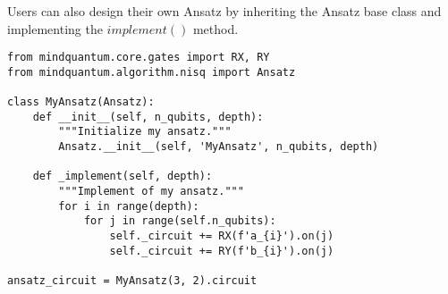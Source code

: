 Users can also design their own Ansatz by inheriting the Ansatz base class and implementing the $implement()$ method.

\begin{lstlisting}
from mindquantum.core.gates import RX, RY
from mindquantum.algorithm.nisq import Ansatz

class MyAnsatz(Ansatz):
    def __init__(self, n_qubits, depth):
        """Initialize my ansatz."""
        Ansatz.__init__(self, 'MyAnsatz', n_qubits, depth)

    def _implement(self, depth):
        """Implement of my ansatz."""
        for i in range(depth):
            for j in range(self.n_qubits):
                self._circuit += RX(f'a_{i}').on(j)
                self._circuit += RY(f'b_{i}').on(j)

ansatz_circuit = MyAnsatz(3, 2).circuit
\end{lstlisting}